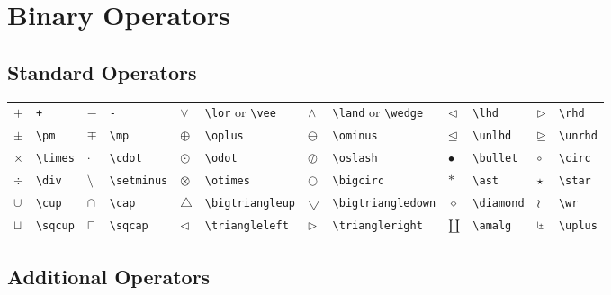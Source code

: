 \documentclass[10pt, english]{article}
\begin{document}
\section{Binary Operators}

	\subsection{Standard Operators}

	\begin{center}
		\scriptsize
	\begin{tabular}{ll|ll|ll|ll|ll|ll}
		$+$ & \verb|+| & $-$ & \verb|-| & $\lor$ & \verb|\lor| or \verb|\vee| & $\land$ & \verb|\land| or \verb|\wedge| & $\lhd$ & \verb|\lhd| & $\rhd$ & \verb|\rhd| \\ 
		$\pm$ & \verb|\pm| & $\mp$ & \verb|\mp| & $\oplus$ & \verb|\oplus| & $\ominus$ & \verb|\ominus| & $\unlhd$ & \verb|\unlhd| & $\unrhd$ & \verb|\unrhd| \\
		$\times$ & \verb|\times| & $\cdot$ & \verb|\cdot| & $\odot$ & \verb|\odot| & $\oslash$ & \verb|\oslash| & $\bullet$ & \verb|\bullet| & $\circ$ & \verb|\circ| \\
		$\div$ & \verb|\div| & $\setminus$ & \verb|\setminus| & $\otimes$ & \verb|\otimes| & $\bigcirc$ & \verb|\bigcirc| & $\ast$ & \verb|\ast| & $\star$ & \verb|\star| \\
		$\cup$ & \verb|\cup| & $\cap$ & \verb|\cap| & $\bigtriangleup$ & \verb|\bigtriangleup| & $\bigtriangledown$ & \verb|\bigtriangledown| & $\diamond$ & \verb|\diamond| & $\wr$ & \verb|\wr| \\ 
		$\sqcup$ & \verb|\sqcup| & $\sqcap$ & \verb|\sqcap| & $\triangleleft$ & \verb|\triangleleft| & $\triangleright$ & \verb|\triangleright| & $\amalg$ & \verb|\amalg| & $\uplus$ & \verb|\uplus| \\
	\end{tabular}
	\end{center}

	\subsection{Additional Operators}
\end{document}
